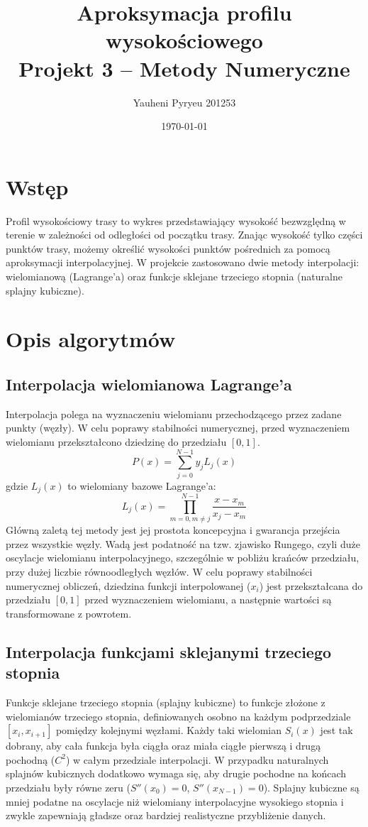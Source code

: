 \documentclass[11pt,a4paper]{article}
\title{Aproksymacja profilu wysokościowego\vspace{0.5em}\\Projekt 3 -- Metody Numeryczne}
\author{Yauheni Pyryeu 201253}
\date{\today}
\begin{document}
\maketitle
\thispagestyle{empty}
\newpage
\tableofcontents
\thispagestyle{empty}
\newpage
\setcounter{page}{1}

\section{Wstęp}
Profil wysokościowy trasy to wykres przedstawiający wysokość bezwzględną w terenie w zależności od odległości od początku trasy. Znając wysokość tylko części punktów trasy, możemy określić wysokości punktów pośrednich za pomocą aproksymacji interpolacyjnej. W projekcie zastosowano dwie metody interpolacji: wielomianową (Lagrange'a) oraz funkcje sklejane trzeciego stopnia (naturalne splajny kubiczne).

\section{Opis algorytmów}
\subsection{Interpolacja wielomianowa Lagrange'a}
Interpolacja polega na wyznaczeniu wielomianu przechodzącego przez zadane punkty (węzły). W celu poprawy stabilności numerycznej, przed wyznaczeniem wielomianu przekształcono dziedzinę do przedziału $[0,1]$.
\[ P(x) = \sum_{j=0}^{N-1} y_j L_j(x) \]
gdzie $L_j(x)$ to wielomiany bazowe Lagrange'a:
\[ L_j(x) = \prod_{m=0, m \neq j}^{N-1} \frac{x - x_m}{x_j - x_m} \]
Główną zaletą tej metody jest jej prostota koncepcyjna i gwarancja przejścia przez wszystkie węzły. Wadą jest podatność na tzw. zjawisko Rungego, czyli duże oscylacje wielomianu interpolacyjnego, szczególnie w pobliżu krańców przedziału, przy dużej liczbie równoodległych węzłów. W celu poprawy stabilności numerycznej obliczeń, dziedzina funkcji interpolowanej ($x_i$) jest przekształcana do przedziału $[0,1]$ przed wyznaczeniem wielomianu, a następnie wartości są transformowane z powrotem.

\subsection{Interpolacja funkcjami sklejanymi trzeciego stopnia}
Funkcje sklejane trzeciego stopnia (splajny kubiczne) to funkcje złożone z wielomianów trzeciego stopnia, definiowanych osobno na każdym podprzedziale $[x_i, x_{i+1}]$ pomiędzy kolejnymi węzłami. Każdy taki wielomian $S_i(x)$ jest tak dobrany, aby cała funkcja była ciągła oraz miała ciągłe pierwszą i drugą pochodną ($C^2$) w całym przedziale interpolacji. W przypadku naturalnych splajnów kubicznych dodatkowo wymaga się, aby drugie pochodne na końcach przedziału były równe zeru ($S''(x_0) = 0$, $S''(x_{N-1}) = 0$). Splajny kubiczne są mniej podatne na oscylacje niż wielomiany interpolacyjne wysokiego stopnia i zwykle zapewniają gładsze oraz bardziej realistyczne przybliżenie danych.
\end{document}
